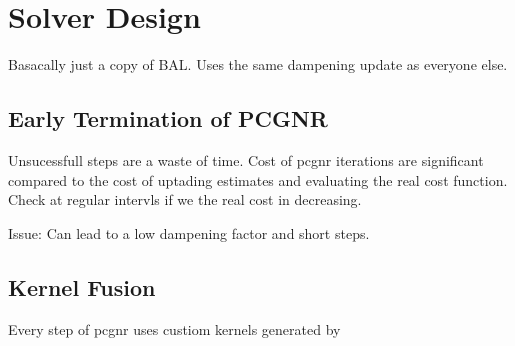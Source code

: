 \section{Solver Design}
Basacally just a copy of BAL.
Uses the same dampening update as everyone else.

\subsection{Early Termination of PCGNR}
Unsucessfull steps are a waste of time.
Cost of \gls{pcgnr} iterations are significant compared to the cost of uptading estimates and evaluating the real cost function.
Check at regular intervls if we the real cost in decreasing.

Issue: Can lead to a low dampening factor and short steps.

\subsection{Kernel Fusion}
Every step of \gls{pcgnr} uses custiom \cuda kernels generated by \caspar